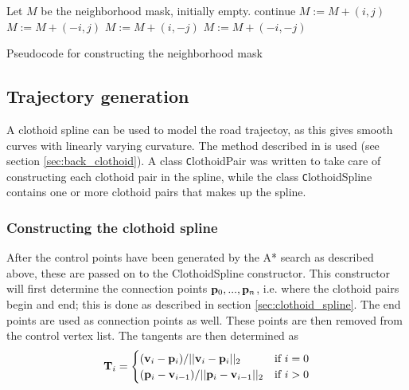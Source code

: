 \begin{algorithm}
\begin{algorithmic}
\STATE Let $M$ be the neighborhood mask, initially empty.
            \STATE continue
        \ENDIF
        \STATE $M := M + (i,j)$
            \STATE $M := M + (-i,j)$
            \STATE $M := M + (i,-j)$
            \STATE $M := M + (-i,-j)$
        \ENDIF
    \ENDFOR
\ENDFOR
\end{algorithmic}
\caption{Pseudocode for constructing the neighborhood mask}
\label{alg:neighborhoodmask}
\end{algorithm}

\subsection{Trajectory generation} 
A clothoid spline can be used to model the road trajectoy, as this gives smooth curves with linearly varying curvature. The method described in \cite{clothoid} is used (see section \ref{sec:back_clothoid}). A class {\texttt ClothoidPair} was written to take care of constructing each clothoid pair in the spline, while the class {\texttt ClothoidSpline} contains one or more clothoid pairs that makes up the spline.

\subsubsection{Constructing the clothoid spline}
After the control points have been generated by the A* search as described above, these are passed on to the ClothoidSpline constructor. This constructor will first determine the connection points ${\mathbf p}_0, ..., {\mathbf p}_n$, i.e. where the clothoid pairs begin and end; this is done as described in section \ref{sec:clothoid_spline}. The end points are used as connection points as well. These points are then removed from the control vertex list. The tangents are then determined as 
\begin{equation}
{\mathbf T}_i = 
\begin{cases}
({\mathbf v}_i - {\mathbf p}_i)/||{\mathbf v}_i - {\mathbf p}_i||_2 & \mbox{if $i = 0$}\\
({\mathbf p}_i - {\mathbf v}_{i-1})/||{\mathbf p}_i - {\mathbf v}_{i-1}||_2 & \mbox{if $i > 0$}
\end{cases}
\label{eq:connector_tangents}
\end{equation}

